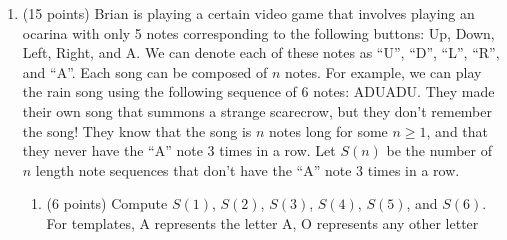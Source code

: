 \documentclass[10pt,letterpaper,unboxed,cm]{article}
\begin{document}
\begin{enumerate}
    \item (15 points) Brian is playing a certain video game that involves playing an ocarina with only 5 notes corresponding to the following buttons: Up, Down, Left, Right, and A. We can denote each of these notes as “U”, “D”, “L”, “R”, and “A”. Each song can be composed of $n$ notes. For example, we can play the rain song using the following sequence of 6 notes: ADUADU. They made their own song that summons a strange scarecrow, but they don’t remember the song! They know that the song is $n$ notes long for some $n \geq 1$, and that they never have the “A” note 3 times in a row. Let $S(n)$ be the number of $n$ length note sequences that don’t have the “A” note 3 times in a row.
    \begin{enumerate}
        \item (6 points) Compute $S(1)$, $S(2)$, $S(3)$, $S(4)$, $S(5)$, and $S(6)$.\\

        For templates, A represents the letter A, O represents any other letter\\


\end{enumerate}
\end{enumerate}
\end{document}
